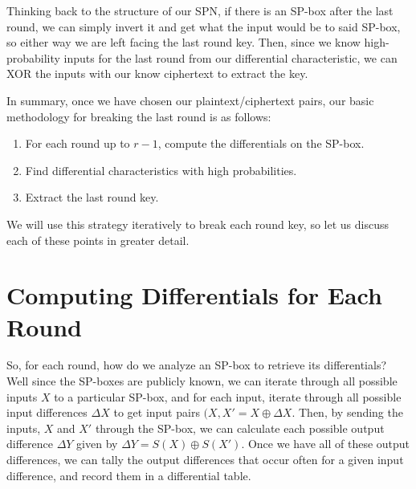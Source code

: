 Thinking back to the structure of our SPN, if there is an SP-box after the last
round, we can simply invert it and get what the input would be to said SP-box,
so either way we are left facing the last round key. Then, since we know 
high-probability inputs for the last round from our differential characteristic,
we can XOR the inputs with our know ciphertext to extract the key.

In summary, once we have chosen our plaintext/ciphertext pairs, our basic
methodology for breaking the last round is as follows:
\begin{enumerate}
\item For each round up to $r-1$, compute the differentials on the SP-box.
\item Find differential characteristics with high probabilities.
\item Extract the last round key.
\end{enumerate}

We will use this strategy iteratively to break each round key, so let us
discuss each of these points in greater detail.

\section{Computing Differentials for Each Round}
So, for each round, how do we analyze an SP-box to retrieve its differentials?
Well since the SP-boxes are publicly known, we can iterate through all possible
inputs $X$ to a particular SP-box, and for each input, iterate through all
possible input differences $\Delta X$ to get input pairs $(X, X' = X \oplus
\Delta X$. Then, by sending the inputs, $X$ and $X'$ through the SP-box, we can
calculate each possible output difference $\Delta Y$ given by $\Delta Y = S(X)
\oplus S(X')$. Once we have all of these output differences, we can tally the
output differences that occur often for a given input difference, and record
them in a differential table. 

